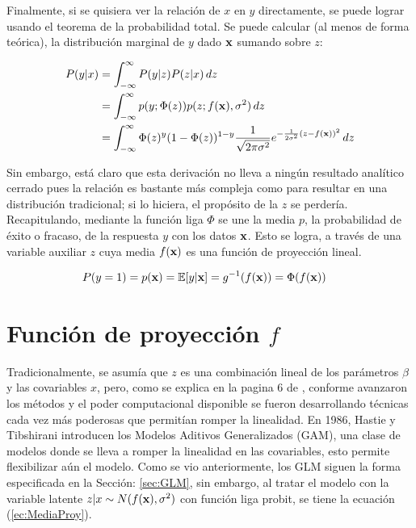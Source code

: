 \documentclass[../Main/Main.tex]{subfiles}
\begin{document}
Finalmente, si se quisiera ver la relación de $x$ en $y$ directamente, se puede lograr usando el teorema de la probabilidad total. Se puede calcular (al menos de forma teórica), la distribución marginal de $y$ dado $\mathbf{x}$ sumando sobre $z$:

\begin{align*}
P(y|x) 	&= \int_{-\infty}^\infty P(y|z)P(z|x)\, dz \\
		&= \int_{-\infty}^\infty p(y;\Phi(z))p(z;f(\mathbf{x}),\sigma^2)\, dz \\
		&= \int_{-\infty}^\infty \Phi(z)^y (1-\Phi(z))^{1-y}
		\dfrac{1}{\sqrt{2\pi\sigma^2}}e^{-\frac{1}{2\sigma^2}(z-f(\mathbf{x}))^2} \, dz
\end{align*}

Sin embargo, está claro que esta derivación no lleva a ningún resultado analítico cerrado pues la relación es bastante más compleja como para resultar en una distribución  tradicional; si lo hiciera, el propósito de la $z$ se perdería.\\

Recapitulando, mediante la función liga $\Phi$ se une la media $p$, la probabilidad de éxito o fracaso, de la respuesta $y$ con los datos $\mathbf{x}$. Esto se logra, a través de una variable auxiliar $z$ cuya media $f(\mathbf{x})$ es una función de proyección lineal. 

\begin{align} \label{ec:MediaProy}
	P(y = 1) = p(\mathbf{x}) &=\mathbb{E}[y|\mathbf{x}] = g^{-1}(f(\mathbf{x})) = \Phi(f(\mathbf{x}))
\end{align}

\section{Función de proyección $f$} \label{sec:FuncProy} 
Tradicionalmente, se asumía que $z$ es una combinación lineal de los parámetros $\beta$ y las covariables $x$, pero, como se explica en la pagina 6 de \autocite{james2013introduction}, conforme avanzaron los métodos y el poder computacional disponible se fueron desarrollando técnicas cada vez más poderosas que permitían romper la linealidad. En 1986, Hastie y Tibshirani introducen los Modelos Aditivos Generalizados (GAM), una clase de modelos donde se lleva a romper la linealidad en las covariables, esto permite flexibilizar aún el modelo. Como se vio anteriormente, los GLM siguen la forma especificada en la Sección: \ref{sec:GLM}, sin embargo, al tratar el modelo con la variable latente $z|x \sim N(f(\mathbf{x}),\sigma^2)$ con función liga probit, se tiene la ecuación (\ref{ec:MediaProy}).\\
\end{document}
